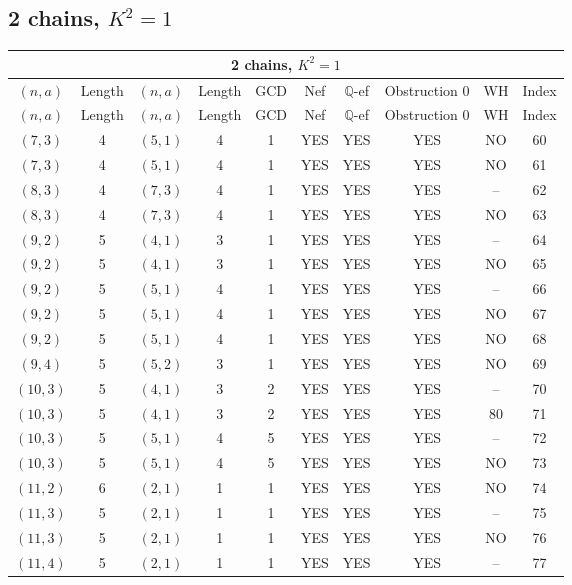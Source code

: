 \subsection{2 chains, $K^2 = 1$}
\begin{longtable}{|c|c|c|c|c|c|c|c|c|c|}
\hline
\multicolumn{10}{|c|}{2 chains, $K^2 = 1$}\\
\hline
$(n,a)$ & Length & $(n,a)$ & Length & GCD & Nef & $\mathbb Q$-ef & Obstruction 0 & WH & Index\\
\hline
\endfirsthead

\hline
$(n,a)$ & Length & $(n,a)$ & Length & GCD & Nef & $\mathbb Q$-ef & Obstruction 0 & WH & Index\\
\hline
\endhead
\hline
\endfoot

$(7, 3)$ & 4 & $(5, 1)$ & 4 & 1 & YES & YES & YES & NO & 60\\
$(7, 3)$ & 4 & $(5, 1)$ & 4 & 1 & YES & YES & YES & NO & 61\\
$(8, 3)$ & 4 & $(7, 3)$ & 4 & 1 & YES & YES & YES & -- & 62\\
$(8, 3)$ & 4 & $(7, 3)$ & 4 & 1 & YES & YES & YES & NO & 63\\
$(9, 2)$ & 5 & $(4, 1)$ & 3 & 1 & YES & YES & YES & -- & 64\\
$(9, 2)$ & 5 & $(4, 1)$ & 3 & 1 & YES & YES & YES & NO & 65\\
$(9, 2)$ & 5 & $(5, 1)$ & 4 & 1 & YES & YES & YES & -- & 66\\
$(9, 2)$ & 5 & $(5, 1)$ & 4 & 1 & YES & YES & YES & NO & 67\\
$(9, 2)$ & 5 & $(5, 1)$ & 4 & 1 & YES & YES & YES & NO & 68\\
$(9, 4)$ & 5 & $(5, 2)$ & 3 & 1 & YES & YES & YES & NO & 69\\
$(10, 3)$ & 5 & $(4, 1)$ & 3 & 2 & YES & YES & YES & -- & 70\\
$(10, 3)$ & 5 & $(4, 1)$ & 3 & 2 & YES & YES & YES & 80 & 71\\
$(10, 3)$ & 5 & $(5, 1)$ & 4 & 5 & YES & YES & YES & -- & 72\\
$(10, 3)$ & 5 & $(5, 1)$ & 4 & 5 & YES & YES & YES & NO & 73\\
$(11, 2)$ & 6 & $(2, 1)$ & 1 & 1 & YES & YES & YES & NO & 74\\
$(11, 3)$ & 5 & $(2, 1)$ & 1 & 1 & YES & YES & YES & -- & 75\\
$(11, 3)$ & 5 & $(2, 1)$ & 1 & 1 & YES & YES & YES & NO & 76\\
$(11, 4)$ & 5 & $(2, 1)$ & 1 & 1 & YES & YES & YES & -- & 77\\

\end{longtable}
